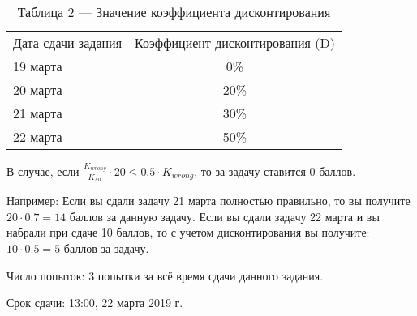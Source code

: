 \begin{table}[H]
    \caption{Таблица 2 — Значение коэффициента дисконтирования}
    \begin{tabular}{|l|c|}
    Дата сдачи задания & Коэффициент дисконтирования (D) \\
    19 марта & 0\% \\
    20 марта & 20\% \\
    21 марта & 30\% \\
    22 марта & 50\% \\
    \end{tabular}
\end{table}

В случае, если $\frac{K_{wrong}}{K_{sit}} \cdot 20 \leq 0.5\cdot K_{wrong}$, то за задачу ставится 0 баллов.

Например:  
Если вы сдали задачу 21 марта полностью правильно, то вы получите $20 \cdot 0.7 = 14$ баллов за данную задачу. 
Если вы сдали задачу 22 марта и вы набрали при сдаче 10 баллов, то с учетом дисконтирования вы получите: $10 \cdot 0.5 = 5$ баллов за задачу.

Число попыток: 3 попытки за всё время сдачи данного задания.

Срок сдачи: 13:00, 22 марта 2019 г.